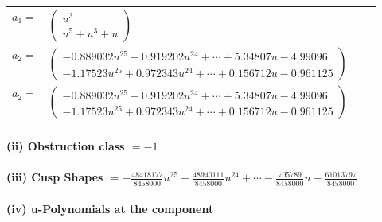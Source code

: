 \documentclass[1p]{elsarticle_modified}
\theoremstyle{definition}
\begin{document}
\begin{tabular}{m{7pt} m{180pt} m{7pt} m{180pt} }
\flushright $a_{1}=$&$\begin{pmatrix}u^3\\u^5+u^3+u\end{pmatrix}$ \\
\flushright $a_{2}=$&$\begin{pmatrix}-0.889032 u^{25}-0.919202 u^{24}+\cdots+5.34807 u-4.99096\\-1.17523 u^{25}+0.972343 u^{24}+\cdots+0.156712 u-0.961125\end{pmatrix}$\\ \flushright $a_{2}=$&$\begin{pmatrix}-0.889032 u^{25}-0.919202 u^{24}+\cdots+5.34807 u-4.99096\\-1.17523 u^{25}+0.972343 u^{24}+\cdots+0.156712 u-0.961125\end{pmatrix}$\\&\end{tabular}
\flushleft \textbf{(ii) Obstruction class $= -1$}\\~\\
\flushleft \textbf{(iii) Cusp Shapes $= -\frac{48418177}{8458000} u^{25}+\frac{48940111}{8458000} u^{24}+\cdots-\frac{705789}{8458000} u-\frac{61013797}{8458000}$}\\~\\
\newpage\renewcommand{\arraystretch}{1}
\flushleft \textbf{(iv) u-Polynomials at the component}\newline \\
\end{document}
